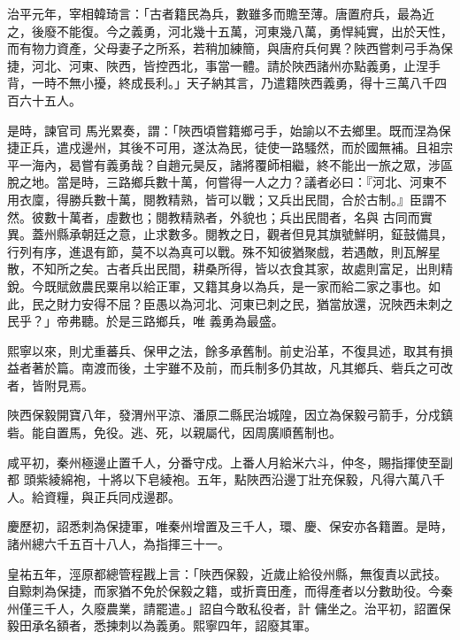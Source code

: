 \begin{pinyinscope}
 治平元年，宰相韓琦言：「古者籍民為兵，數雖多而贍至薄。唐置府兵，最為近之，後廢不能復。今之義勇，河北幾十五萬，河東幾八萬，勇悍純實，出於天性，而有物力資產，父母妻子之所系，若稍加練簡，與唐府兵何異？陜西嘗刺弓手為保捷，河北、河東、陜西，皆控西北，事當一體。請於陜西諸州亦點義勇，止涅手背，一時不無小擾，終成長利。」天子納其言，乃遣籍陜西義勇，得十三萬八千四百六十五人。



 是時，諫官司
 馬光累奏，謂：「陜西頃嘗籍鄉弓手，始諭以不去鄉里。既而涅為保捷正兵，遣戍邊州，其後不可用，遂汰為民，徒使一路騷然，而於國無補。且祖宗平一海內，曷嘗有義勇哉？自趙元昊反，諸將覆師相繼，終不能出一旅之眾，涉區脫之地。當是時，三路鄉兵數十萬，何嘗得一人之力？議者必曰：『河北、河東不用衣廩，得勝兵數十萬，閱教精熟，皆可以戰；又兵出民間，合於古制。』臣謂不然。彼數十萬者，虛數也；閱教精熟者，外貌也；兵出民間者，名與
 古同而實異。蓋州縣承朝廷之意，止求數多。閱教之日，觀者但見其旗號鮮明，鉦鼓備具，行列有序，進退有節，莫不以為真可以戰。殊不知彼猶聚戲，若遇敵，則瓦解星散，不知所之矣。古者兵出民間，耕桑所得，皆以衣食其家，故處則富足，出則精銳。今既賦斂農民粟帛以給正軍，又籍其身以為兵，是一家而給二家之事也。如此，民之財力安得不屈？臣愚以為河北、河東已刺之民，猶當放還，況陜西未刺之民乎？」帝弗聽。於是三路鄉兵，唯
 義勇為最盛。



 熙寧以來，則尤重蕃兵、保甲之法，餘多承舊制。前史沿革，不復具述，取其有損益者著於篇。南渡而後，土宇雖不及前，而兵制多仍其故，凡其鄉兵、砦兵之可改者，皆附見焉。



 陜西保毅開寶八年，發渭州平涼、潘原二縣民治城隍，因立為保毅弓箭手，分戍鎮砦。能自置馬，免役。逃、死，以親屬代，因周廣順舊制也。



 咸平初，秦州極邊止置千人，分番守戍。上番人月給米六斗，仲冬，賜指揮使至副都
 頭紫綾綿袍，十將以下皂綾袍。五年，點陜西沿邊丁壯充保毅，凡得六萬八千人。給資糧，與正兵同戍邊郡。



 慶歷初，詔悉刺為保捷軍，唯秦州增置及三千人，環、慶、保安亦各籍置。是時，諸州總六千五百十八人，為指揮三十一。



 皇祐五年，涇原都總管程戡上言：「陜西保毅，近歲止給役州縣，無復責以武技。自黥刺為保捷，而家猶不免於保毅之籍，或折賣田產，而得產者以分數助役。今秦州僅三千人，久廢農業，請罷遣。」詔自今敢私役者，計
 傭坐之。治平初，詔置保毅田承名額者，悉揀刺以為義勇。熙寧四年，詔廢其軍。




\end{pinyinscope}
